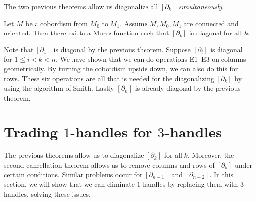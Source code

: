 The two previous theorems allow us diagonalize all $[\partial_k]$ \emph{simultaneously}.
\begin{theorem}
    Let $M$ be a cobordism from  $ M_0$ to $M_{1}$.
    Assume $M, M_0, M_1$ are connected and oriented.
    Then there exists a Morse function such that $[\partial_k]$ is diagonal for all $k$.
\end{theorem}
\begin{myproof}
    Note that $[\partial_1]$ is diagonal by the previous theorem.
    Suppose $[\partial_i]$ is diagonal for  $1 \le  i < k < n$.
    We have shown that we can do operations E1--E3 on columns geometrically.
    By turning the cobordism upside down, we can also do this for rows.
    These six operations are all that is needed for the diagonalizing $[\partial_k]$ by using the algorithm of Smith.
    Lastly $[\partial_n]$ is already diagonal by the previous theorem.
\end{myproof}



\section{Trading $1$-handles for $3$-handles}
The previous theorems allow us to diagonalize $[\partial_k]$ for all $k$.
Moreover, the second cancellation theorem allows us to remove columns and rows of $[\partial_k]$ under certain conditions.
Similar problems occur for $[\partial_{n-1}]$ and $[\partial_{n-2}]$.
In this section, we will show that we can eliminate $1$-handles by replacing them with $3$-handles, solving these issues.

